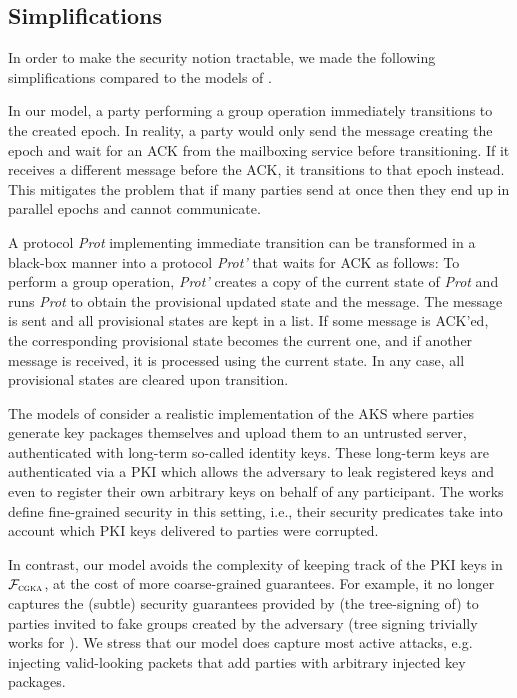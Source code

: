 \subsection{Simplifications}\label{sec:simplifications}
In order to make the security notion tractable, we made the following simplifications compared to the models of \cite{TCC:ACJM20,EPRINT:AlwJosMul20,hashimoto2021cmpke}. 
\begin{description}[itemsep=0pt]
	\item[Immediate transition]
	In our model, a party performing a group operation immediately transitions to the created epoch. In reality, a party would only send the message creating the epoch and wait for an ACK from the mailboxing service before transitioning. If it receives a different message before the ACK, it transitions to that epoch instead. This mitigates the problem that if many parties send at once then they end up in parallel epochs and cannot communicate.
	
	A protocol {\it Prot} implementing immediate transition can be transformed in a black-box manner into a protocol {\it Prot'} that waits for ACK as follows: To perform a group operation, {\it Prot'} creates a copy of the current state of {\it Prot} and runs {\it Prot} to obtain the provisional updated state and the message. The message is sent and all provisional states are kept in a list. If some message is ACK'ed, the corresponding provisional state becomes the current one, and if another message is received, it is processed using the current state. In any case, all provisional states are cleared upon transition.
	
	\item[Simplified PKI]
	The models of \cite{EPRINT:AlwJosMul20,hashimoto2021cmpke} consider a realistic implementation of the AKS where parties generate key packages themselves and upload them to an untrusted server, authenticated with long-term so-called identity keys. These long-term keys are authenticated via a PKI which allows the adversary to leak registered keys and even to register their own arbitrary keys on behalf of any participant. The works \cite{EPRINT:AlwJosMul20,hashimoto2021cmpke} define fine-grained security in this setting, i.e., their security predicates take into account which PKI keys delivered to parties were corrupted.
	
	In contrast, our model avoids the complexity of keeping track of the PKI keys in $\mathcal{F}_{\normalfont\textsc{cgka}}$, at the cost of more coarse-grained guarantees. For example, it no longer captures the (subtle) security guarantees provided by (the tree-signing of) \protITK to parties invited to fake groups created by the adversary (tree signing trivially works for \saik). We stress that our model does capture most active attacks, e.g. injecting valid-looking packets that add parties with arbitrary injected key packages.
	

\end{description}
